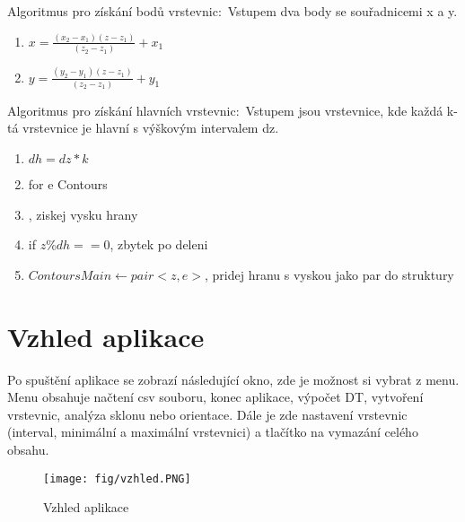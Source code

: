 \documentclass[oneside,12pt,a4paper]{book}
\begin{document}
Algoritmus pro získání bodů vrstevnic$:$
Vstupem dva body se souřadnicemi x a y.
\begin{enumerate}
    \item {$x=\frac{(x_2-x_1)(z-z_1)}{(z_2-z_1)}+x_1$}
    \item {$y=\frac{(y_2-y_1)(z-z_1)}{(z_2-z_1)}+y_1$}
\end{enumerate}

Algoritmus pro získání hlavních vrstevnic$:$
Vstupem jsou vrstevnice, kde každá k-tá vrstevnice je hlavní s výškovým intervalem dz.
\begin{enumerate}
    \item $dh = dz * k$
    \item for e \in Contours
    \item {}, ziskej vysku hrany
    \item \quad if {$z\%dh ==0$}, zbytek po deleni
    \item \quad \quad $ContoursMain \longleftarrow pair<z,e>$, pridej hranu s vyskou jako par do struktury
\end{enumerate}








\chapter{Vzhled aplikace}
Po spuštění aplikace se zobrazí následující okno, zde je možnost si vybrat z menu. Menu obsahuje načtení csv souboru, konec aplikace, výpočet DT, vytvoření vrstevnic, analýza sklonu nebo orientace. Dále je zde nastavení vrstevnic (interval, minimální a maximální vrstevnici) a tlačítko na vymazání celého obsahu.
\begin{figure}[ht!]
    \centering
    \texttt{[image: fig/vzhled.PNG]}
    \caption{Vzhled aplikace}
    \label{fig:Zadání úlohy}
\end{figure}
\end{document}
